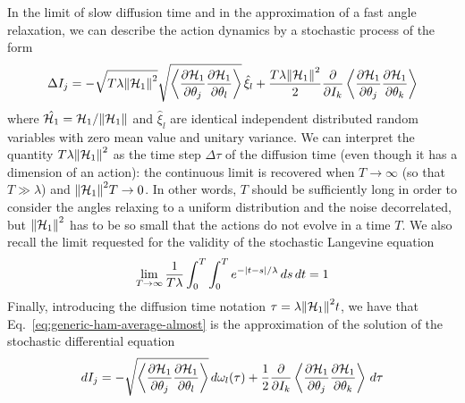 In the limit of slow diffusion time and in the approximation of a fast angle relaxation, we can describe the action dynamics by a stochastic process of the form
\begin{equation}
	\Delta I_j = -\sqrt{T\lambda\norm{\mathcal{H}_1}^2}\sqrt{\left\langle\pdv{\mathcal{H}_1}{\theta_j}\pdv{\mathcal{H}_1}{\theta_l}\right\rangle}\,\hat{\xi}_l + \frac{T\lambda\norm{\mathcal{H}_1}^2}{2}\pdv{}{I_k}\left\langle\pdv{\mathcal{H}_1}{\theta_j}\pdv{\mathcal{H}_1}{\theta_k}\right\rangle
	\label{eq:generic-ham-average-almost}
\end{equation}
where \(\hat{\mathcal{H}_1}=\mathcal{H}_1/\norm{\mathcal{H}_1}\) and \(\hat{\xi}_l\) are identical independent distributed random variables with zero mean value and unitary variance. We can interpret the quantity \(T\lambda\norm{\mathcal{H}_1}^2\) as the time step \(\Delta\tau\) of the diffusion time (even though it has a dimension of an action): the continuous limit is recovered when \(T\to\infty\) (so that \(T\gg\lambda\)) and \(\norm{\mathcal{H}_1}^2T\to 0\). In other words, \(T\) should be sufficiently long in order to consider the angles relaxing to a uniform distribution and the noise decorrelated, but \(\norm{\mathcal{H}_1}^2\) has to be so small that the actions do not evolve in a time \(T\). We also recall the limit requested for the validity of the stochastic Langevine equation
\begin{equation}
	\lim_{T\to\infty}\frac{1}{T\lambda}\int_0^T\int_0^T e^{-\abs{t-s}/\lambda}\,ds\,dt = 1
\end{equation}
Finally, introducing the diffusion time notation \(\tau = \lambda\norm{\mathcal{H}_1}^2 t\), we have that Eq.~\eqref{eq:generic-ham-average-almost} is the approximation of the solution of the stochastic differential equation
\begin{equation}
	dI_j = -\sqrt{\left\langle\pdv{\mathcal{H}_1}{\theta_j}\pdv{\mathcal{H}_1}{\theta_l}\right\rangle}\,d\omega_l(\tau) + \frac{1}{2}\pdv{}{I_k}\left\langle\pdv{\mathcal{H}_1}{\theta_j}\pdv{\mathcal{H}_1}{\theta_k}\right\rangle\,d\tau
	\label{eq:final-ham-approximation}
\end{equation}

